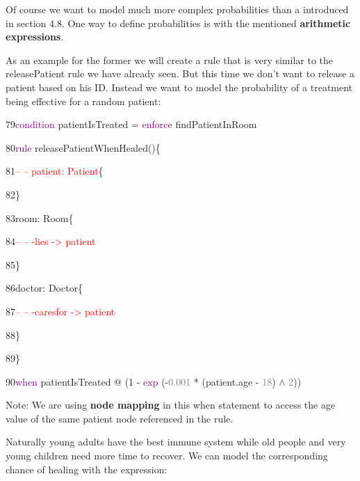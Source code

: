 Of course we want to model much more complex probabilities than a introduced in section 4.8.
One way to define probabilities is with the mentioned \textbf{arithmetic expressions}.

As an example for the former we will create a rule that is very similar to the \textsf{releasePatient} rule we have already seen. But this time we don't want to release a patient based on his ID. Instead we want to model the probability of a treatment being effective for a random patient:\newline

{

79\hspace{0.5cm}\textcolor{Purple}{condition} patientIsTreated = \textcolor{Purple}{enforce} findPatientInRoom 

80\hspace{0.5cm}\textcolor{Purple}{rule} releasePatientWhenHealed()\{

81\hspace{1cm}\textcolor{red}{-- -- patient: Patient}\{

82\hspace{1cm}\}

83\hspace{1cm}room: Room\{

84\hspace{1.5cm}\textcolor{red}{-- -- -lies -> patient}

85\hspace{1cm}\}

86\hspace{1cm}doctor: Doctor\{

87\hspace{1.5cm}\textcolor{red}{-- -- -caresfor -> patient}

88\hspace{1cm}\}

89\hspace{0.5cm}\}

90\hspace{0.5cm}\textcolor{Purple}{when} patientIsTreated @ (1 - \textcolor{Purple}{exp} (-\textcolor{Grey}{0.001} * (patient.age - \textcolor{Grey}{18}) $\wedge$ \textcolor{Grey}{2}))\newline

}
Note: We are using \textbf{node mapping} in this when statement to access the \textsf{age} value of the same patient node referenced in the rule.\newline

Naturally young adults have the best immune system while old people and very young children need more time to recover. We can model the corresponding chance of healing with the expression:

